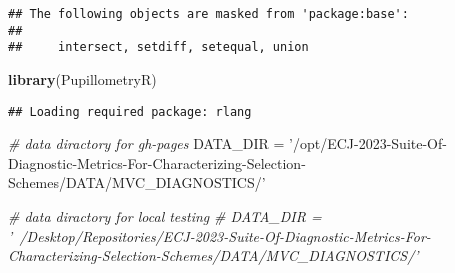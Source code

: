 \documentclass[]{book}
\newenvironment{Shaded}{\begin{snugshade}}{\end{snugshade}}
\newcommand{\CommentTok}[1]{\textcolor[rgb]{0.56,0.35,0.01}{\textit{#1}}}
\newcommand{\KeywordTok}[1]{\textcolor[rgb]{0.13,0.29,0.53}{\textbf{#1}}}
\newcommand{\NormalTok}[1]{#1}
\newcommand{\StringTok}[1]{\textcolor[rgb]{0.31,0.60,0.02}{#1}}
\begin{document}
\begin{verbatim}
## The following objects are masked from 'package:base':
## 
##     intersect, setdiff, setequal, union
\end{verbatim}

\begin{Shaded}
\begin{Highlighting}[]
\KeywordTok{library}\NormalTok{(PupillometryR)}
\end{Highlighting}
\end{Shaded}

\begin{verbatim}
## Loading required package: rlang
\end{verbatim}

\begin{Shaded}
\begin{Highlighting}[]
\CommentTok{# data diractory for gh-pages}
\NormalTok{DATA_DIR =}\StringTok{ '/opt/ECJ-2023-Suite-Of-Diagnostic-Metrics-For-Characterizing-Selection-Schemes/DATA/MVC_DIAGNOSTICS/'}

\CommentTok{# data diractory for local testing}
\CommentTok{# DATA_DIR = '~/Desktop/Repositories/ECJ-2023-Suite-Of-Diagnostic-Metrics-For-Characterizing-Selection-Schemes/DATA/MVC_DIAGNOSTICS/'}


\end{Highlighting}
\end{Shaded}
\end{document}

